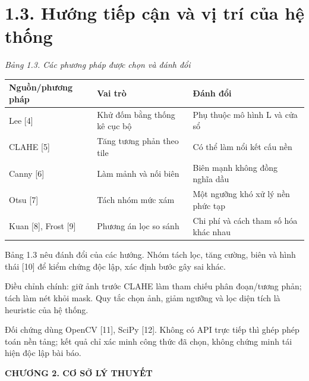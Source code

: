 \documentclass[12pt,a4paper]{extreport}
\begin{document}
\section*{1.3. Hướng tiếp cận và vị trí của hệ thống}
{\fontsize{10.5}{12}\selectfont\textit{Bảng 1.3. Các phương pháp được chọn và đánh đổi}
\begin{longtable}{>{\raggedright\arraybackslash}p{5.035cm}|>{\raggedright\arraybackslash}p{5.035cm}|>{\raggedright\arraybackslash}p{5.035cm}}
\textbf{Nguồn/\allowbreak{}phương pháp} & \textbf{Vai trò} & \textbf{Đánh đổi}\\\hline
\endhead
Lee [4] & Khử đốm bằng thống kê cục bộ & Phụ thuộc mô hình L và cửa sổ\\\hline
CLAHE [5] & Tăng tương phản theo tile & Có thể làm nổi kết cấu nền\\\hline
Canny [6] & Làm mảnh và nối biên & Biên mạnh không đồng nghĩa dầu\\\hline
Otsu [7] & Tách nhóm mức xám & Một ngưỡng khó xử lý nền phức tạp\\\hline
Kuan [8],\allowbreak{} Frost [9] & Phương án lọc so sánh & Chi phí và cách tham số hóa khác nhau\\\hline
\end{longtable}}
Bảng 1.3 nêu đánh đổi của các hướng. Nhóm tách lọc,\allowbreak{} tăng cường,\allowbreak{} biên và hình thái [10] để kiểm chứng độc lập,\allowbreak{} xác định bước gây sai khác.
\par
Điều chỉnh chính: giữ ảnh trước CLAHE làm tham chiếu phân đoạn/\allowbreak{}tương phản; tách làm nét khỏi mask. Quy tắc chọn ảnh,\allowbreak{} giảm ngưỡng và lọc diện tích là heuristic của hệ thống.
\par
Đối chứng dùng OpenCV [11],\allowbreak{} SciPy [12]. Không có API trực tiếp thì ghép phép toán nền tảng; kết quả chỉ xác minh công thức đã chọn,\allowbreak{} không chứng minh tái hiện độc lập bài báo.
\par
\clearpage
\begin{center}\Large\bfseries CHƯƠNG 2. CƠ SỞ LÝ THUYẾT\end{center}
\end{document}
